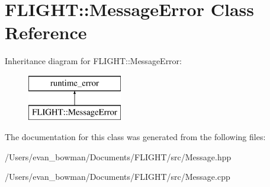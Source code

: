 \hypertarget{class_f_l_i_g_h_t_1_1_message_error}{}\section{F\+L\+I\+G\+HT\+:\+:Message\+Error Class Reference}
\label{class_f_l_i_g_h_t_1_1_message_error}
Inheritance diagram for F\+L\+I\+G\+HT\+:\+:Message\+Error\+:\begin{figure}[H]
\begin{center}
\leavevmode
\includegraphics[height=2.000000cm]{class_f_l_i_g_h_t_1_1_message_error}
\end{center}
\end{figure}


The documentation for this class was generated from the following files\+:\begin{DoxyCompactItemize}
\item 
/\+Users/evan\+\_\+bowman/\+Documents/\+F\+L\+I\+G\+H\+T/src/Message.\+hpp\item 
/\+Users/evan\+\_\+bowman/\+Documents/\+F\+L\+I\+G\+H\+T/src/Message.\+cpp\end{DoxyCompactItemize}
